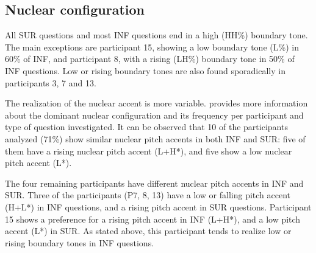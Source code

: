 \documentclass[output=paper,colorlinks,citecolor=brown,draftmode]{langscibook}
\begin{document}
\subsection{Nuclear configuration}
All SUR questions and most INF questions end in a high (HH\%) boundary tone. The main exceptions are participant 15, showing a low boundary tone (L\%) in 60\% of INF, and participant 8, with a rising (LH\%) boundary tone in 50\% of INF questions. Low or rising boundary tones are also found sporadically in participants 3, 7 and 13.

The realization of the nuclear accent is more variable.  provides more information about the dominant nuclear configuration and its frequency per participant and type of question investigated. It can be observed that 10 of the participants analyzed (71\%) show similar nuclear pitch accents in both INF and SUR: five of them have a rising nuclear pitch accent (L+H*), and five show a low nuclear pitch accent (L*).

The four remaining participants have different nuclear pitch accents in INF and SUR. Three of the participants (P7, 8, 13) have a low or falling pitch accent (H+L*) in INF questions, and a rising pitch accent in SUR questions. Participant 15 shows a preference for a rising pitch accent in INF (L+H*), and a low pitch accent (L*) in SUR. As stated above, this participant tends to realize low or rising boundary tones in INF questions.
\end{document}

